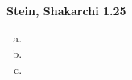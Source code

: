 \textbf{Stein, Shakarchi 1.25}

\begin{enumerate}[(a)]
    \item 
    \pagebreak
    \item 
    \item 
\end{enumerate}